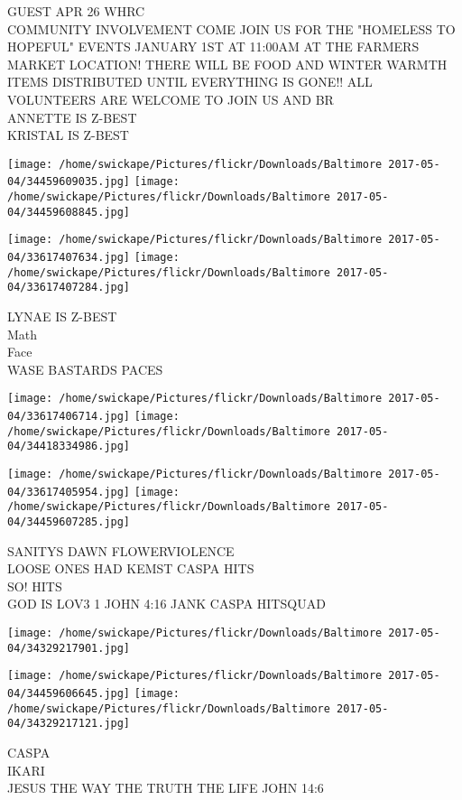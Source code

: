 \documentclass[10pt,letterpaper]{article}
\begin{document}
GUEST APR 26 WHRC\\
COMMUNITY INVOLVEMENT COME JOIN US FOR THE "HOMELESS TO HOPEFUL" EVENTS JANUARY 1ST AT 11:00AM AT THE FARMERS MARKET LOCATION!  THERE WILL BE FOOD AND WINTER WARMTH ITEMS DISTRIBUTED UNTIL EVERYTHING IS GONE!!  ALL VOLUNTEERS ARE WELCOME TO JOIN US AND BR\\
ANNETTE IS Z{-}BEST\\
KRISTAL IS Z{-}BEST
\pagebreak

\texttt{[image: /home/swickape/Pictures/flickr/Downloads/Baltimore 2017-05-04/34459609035.jpg]}
\texttt{[image: /home/swickape/Pictures/flickr/Downloads/Baltimore 2017-05-04/34459608845.jpg]}

\texttt{[image: /home/swickape/Pictures/flickr/Downloads/Baltimore 2017-05-04/33617407634.jpg]}
\texttt{[image: /home/swickape/Pictures/flickr/Downloads/Baltimore 2017-05-04/33617407284.jpg]}

LYNAE IS Z{-}BEST\\
Math\\
Face\\
WASE BASTARDS PACES
\pagebreak

\texttt{[image: /home/swickape/Pictures/flickr/Downloads/Baltimore 2017-05-04/33617406714.jpg]}
\texttt{[image: /home/swickape/Pictures/flickr/Downloads/Baltimore 2017-05-04/34418334986.jpg]}

\texttt{[image: /home/swickape/Pictures/flickr/Downloads/Baltimore 2017-05-04/33617405954.jpg]}
\texttt{[image: /home/swickape/Pictures/flickr/Downloads/Baltimore 2017-05-04/34459607285.jpg]}

SANITYS DAWN FLOWERVIOLENCE\\
LOOSE ONES HAD KEMST CASPA HITS\\
SO!  HITS\\
GOD IS LOV3 1 JOHN 4:16 JANK CASPA HITSQUAD
\pagebreak

\texttt{[image: /home/swickape/Pictures/flickr/Downloads/Baltimore 2017-05-04/34329217901.jpg]}

\vspace{0.25in}
\texttt{[image: /home/swickape/Pictures/flickr/Downloads/Baltimore 2017-05-04/34459606645.jpg]}
\texttt{[image: /home/swickape/Pictures/flickr/Downloads/Baltimore 2017-05-04/34329217121.jpg]}

CASPA\\
IKARI\\
JESUS THE WAY THE TRUTH THE LIFE JOHN 14:6
\pagebreak
\end{document}
